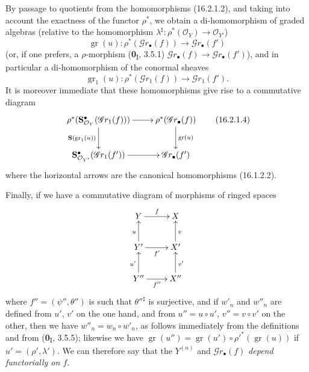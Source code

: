 \begin{env}[16.2.1]
By passage to quotients from the homomorphisms (16.2.1.2), and taking
into account the exactness of the functor $\rho^*$, we obtain a di-homomorphism
of graded algebras (relative to the homomorphism
$\lambda^\sharp:\rho^*(\mathcal{O}_Y)\to\mathcal{O}_{Y'}$)
\[
  \operatorname{gr}(u):
  \rho^*(\mathscr{G}r_\bullet(f))
  \longrightarrow\mathscr{G}r_\bullet(f')
  \tag{16.2.1.3}
  \label{IV.16.2.1.3}
\]
(or, if one prefers, a $\rho$-morphism (\textbf{0}\textsubscript{I}, 3.5.1)
$\mathscr{G}r_\bullet(f)\to\mathscr{G}r_\bullet(f')$), and in particular a
di-homomorphism of the conormal sheaves
\[
  \operatorname{gr}_1(u):
  \rho^*(\mathscr{G}r_1(f))\longrightarrow\mathscr{G}r_1(f').
\]
It is moreover immediate that these homomorphisms give rise to a commutative
diagram
\[
  \xymatrix{
    \rho^*(\mathbf{S}_{\mathcal{O}_Y}^{\bullet}
      (\mathscr{G}r_1(f)))
      \ar[r] \ar[d]_-{\mathbf{S}(\operatorname{gr}_1(u))}
      & \rho^*(\mathscr{G}r_\bullet(f))
        \ar[d]^-{\operatorname{gr}(u)} \\
    \mathbf{S}_{\mathcal{O}_{Y'}}^{\bullet}
      (\mathscr{G}r_1(f'))
      \ar[r]
      & \mathscr{G}r_\bullet(f')
  }
  \tag{16.2.1.4}
  \label{IV.16.2.1.4}
\]
where the horizontal arrows are the canonical homomorphisms (16.1.2.2).

Finally, if we have a commutative diagram of morphisms of ringed spaces
\[
  \xymatrix{
    Y \ar[r]^f & X \\
    Y' \ar[r]_{f'} \ar[u]^u & X' \ar[u]_v \\
    Y'' \ar[r]_{f''} \ar[u]^{u'} & X'' \ar[u]_{v'}
  }
\]
where $f''=(\psi'',\theta'')$ is such that $\theta''^\sharp$ is surjective, and if
$w'_n$ and $w''_n$ are defined from $u'$, $v'$ on the one hand, and from
$u''=u\circ u'$, $v''=v\circ v'$ on the other, then we have
$w''_n=w_n\circ w'_n$, as follows immediately from the definitions and from
(\textbf{0}\textsubscript{I}, 3.5.5); likewise we have
$\operatorname{gr}(u'')=
\operatorname{gr}(u')\circ\rho'^*(\operatorname{gr}(u))$ if
$u'=(\rho',\lambda')$. We can therefore say that the $Y^{(n)}$ and
$\mathscr{G}r_\bullet(f)$ \emph{depend functorially on $f$}.
\end{env}

